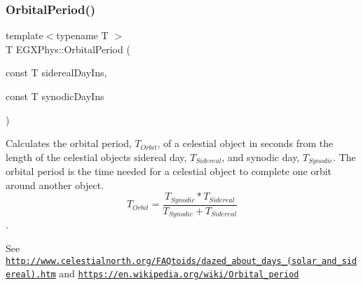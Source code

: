 \subsubsection{\texorpdfstring{Orbital\+Period()}{OrbitalPeriod()}}
{\footnotesize\ttfamily template$<$typename T $>$ \\
T E\+G\+X\+Phys\+::\+Orbital\+Period (\begin{DoxyParamCaption}\item[{const T}]{sidereal\+Day\+Ins,  }\item[{const T}]{synodic\+Day\+Ins }\end{DoxyParamCaption})}



Calculates the orbital period, $T_{Orbit}$, of a celestial object in seconds from the length of the celestial object\textquotesingle{}s sidereal day, $T_{Sidereal}$, and synodic day, $T_{Synodic}$. The orbital period is the time needed for a celestial object to complete one orbit around another object. \[ T_{Orbit}=\dfrac{T_{Synodic} * T_{Sidereal}}{T_{Synodic} + T_{Sidereal}}\]. 

See \href{http://www.celestialnorth.org/FAQtoids/dazed_about_days_(solar_and_sidereal).htm}{\tt http\+://www.\+celestialnorth.\+org/\+F\+A\+Qtoids/dazed\+\_\+about\+\_\+days\+\_\+(solar\+\_\+and\+\_\+sidereal).\+htm} and \href{https://en.wikipedia.org/wiki/Orbital_period}{\tt https\+://en.\+wikipedia.\+org/wiki/\+Orbital\+\_\+period}


